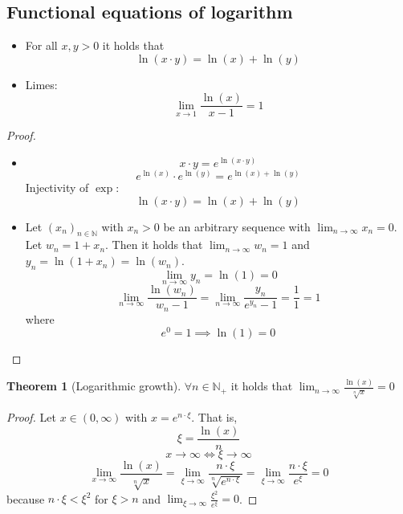 \documentclass[a4paper,landscape,twocolumn]{article}
\theoremstyle{definition}
\newtheorem{theorem}{Theorem}
\begin{document}
\subsection{Functional equations of logarithm}
%
\begin{itemize}
  \item
    For all $x,y > 0$ it holds that
    \[ \ln(x \cdot y) = \ln(x) + \ln(y) \]
  \item Limes:
    \[ \lim_{x \to 1} \frac{\ln(x)}{x - 1} = 1 \]
\end{itemize}
\begin{proof}
  \begin{itemize}
    \item
      \[ x \cdot y = e^{\ln(x \cdot y)} \]
      \[ e^{\ln(x)} \cdot e^{\ln(y)} = e^{\ln(x) + \ln(y)} \]
      Injectivity of $\exp$:
      \[ \ln(x \cdot y) = \ln(x) + \ln(y) \]
    \item
      Let $(x_n)_{n\in\mathbb N}$ with $x_n > 0$ be an arbitrary
      sequence with $\lim_{n\to\infty} x_n = 0$.
      Let $w_n = 1 + x_n$. Then it holds that
      $\lim_{n\to\infty} w_n = 1$ and $y_n = \ln(1 + x_n) = \ln(w_n)$.
      \[ \lim_{n\to\infty} y_n = \ln(1) = 0 \]
      \[ \lim_{n\to\infty} \frac{\ln(w_n)}{w_n - 1} = \lim_{n\to\infty} \frac{y_n}{e^{y_n} - 1} = \frac11 = 1 \]
      where
      \[ e^0 = 1 \implies \ln(1) = 0 \]
  \end{itemize}
\end{proof}

\begin{theorem}[Logarithmic growth]
  $\forall n \in \mathbb N_+$ it holds that $\lim_{n\to\infty} \frac{\ln(x)}{\sqrt[n]{x}} = 0$
\end{theorem}
\begin{proof}
  Let $x \in (0,\infty)$ with $x = e^{n\cdot\xi}$. That is,
  \[ \xi = \frac{\ln(x)}{n} \]
  \[ x \to \infty \Leftrightarrow \xi \to \infty \]
  \[
    \lim_{x\to\infty} \frac{\ln(x)}{\sqrt[n]{x}}
    = \lim_{\xi\to\infty} \frac{n \cdot \xi}{\sqrt[n]{e^{n \cdot \xi}}}
    = \lim_{\xi\to\infty} \frac{n \cdot \xi}{e^\xi} = 0
  \]
  because $n \cdot \xi < \xi^2$ for $\xi > n$ and $\lim_{\xi\to\infty} \frac{\xi^2}{e^\xi} = 0$.
\end{proof}
\end{document}
